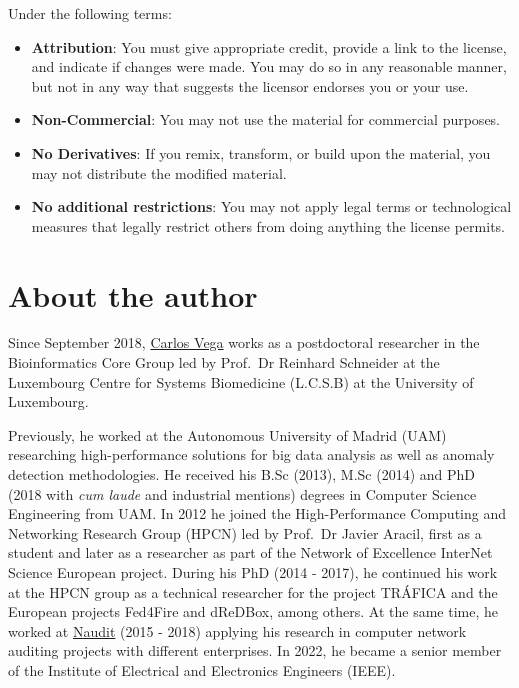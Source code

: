 \documentclass[
]{book}
\providecommand{\tightlist}{%
  \setlength{\itemsep}{0pt}\setlength{\parskip}{0pt}}
\begin{document}
Under the following terms:

\begin{itemize}
\tightlist
\item
  \textbf{Attribution}: You must give appropriate credit, provide a link to the license, and indicate if changes were made. You may do so in any reasonable manner, but not in any way that suggests the licensor endorses you or your use.
\item
  \textbf{Non-Commercial}: You may not use the material for commercial purposes.
\item
  \textbf{No Derivatives}: If you remix, transform, or build upon the material, you may not distribute the modified material.
\item
  \textbf{No additional restrictions}: You may not apply legal terms or technological measures that legally restrict others from doing anything the license permits.
\end{itemize}

\hypertarget{about-the-author}{%
\section*{About the author}\label{about-the-author}}

Since September 2018, \href{https://wwwen.uni.lu/lcsb/people/carlos_vega_moreno}{Carlos Vega} works as a postdoctoral researcher in the Bioinformatics Core Group led by Prof.~Dr Reinhard Schneider at the Luxembourg Centre for Systems Biomedicine (L.C.S.B) at the University of Luxembourg.

Previously, he worked at the Autonomous University of Madrid (UAM) researching high-performance solutions for big data analysis as well as anomaly detection methodologies. He received his B.Sc (2013), M.Sc (2014) and PhD (2018 with \emph{cum laude} and industrial mentions) degrees in Computer Science Engineering from UAM. In 2012 he joined the High-Performance Computing and Networking Research Group (HPCN) led by Prof.~Dr Javier Aracil, first as a student and later as a researcher as part of the Network of Excellence InterNet Science European project. During his PhD (2014 - 2017), he continued his work at the HPCN group as a technical researcher for the project TRÁFICA and the European projects Fed4Fire and dReDBox, among others. At the same time, he worked at \href{https://www.naudit.es/en}{Naudit} (2015 - 2018) applying his research in computer network auditing projects with different enterprises. In 2022, he became a senior member of the Institute of Electrical and Electronics Engineers (IEEE).
\end{document}
